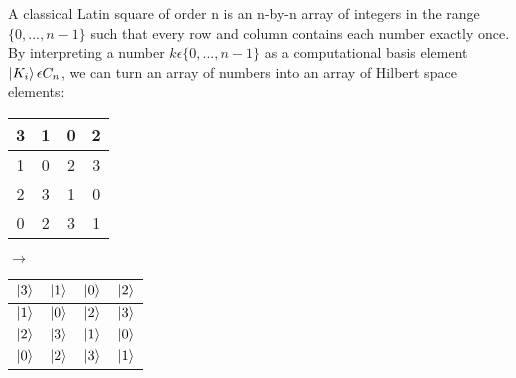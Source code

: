 \documentclass[a4paper, 12pt]{article}
\begin{document}
A classical Latin square of order n is an n-by-n array of integers in the range 
$\{0,...,n-1\}$ such that every row and column contains each number exactly once.
By interpreting a number  
$ k \epsilon \{0,...,n - 1\}$ as a computational basis element $\ket{K_i} \epsilon C_n$,
we can turn an array of numbers into an array of Hilbert space elements:~\cite{musto2016quantum}

\begin{center}
\begin{tabular}{||c|c|c|c||} 
   \hline
   3 & 1 & 0 & 2 \\
   \hline
   1 & 0 & 2 & 3\\
   \hline
   2 & 3 & 1 & 0\\
   \hline
   0 & 2 & 3 & 1\\ 
   \hline
 \end{tabular} $\rightarrow$
\noindent
\begin{tabular}{||c|c|c|c||}
  \hline
  $\ket{3}$ & $\ket{1}$ & $\ket{0}$ & $\ket{2}$ \\
  \hline
  $\ket{1}$ & $\ket{0}$ & $\ket{2}$ & $\ket{3}$\\
  \hline
  $\ket{2}$ & $\ket{3}$ & $\ket{1}$ & $\ket{0}$\\
  \hline
  $\ket{0}$ & $\ket{2}$ & $\ket{3}$ & $\ket{1}$\\ 
  \hline
\end{tabular}
\end{center}
\printbibliography
\end{document}
